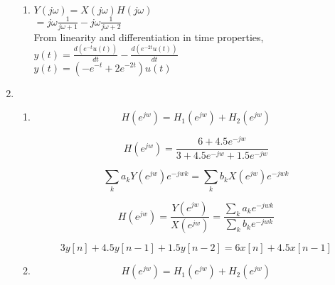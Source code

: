 \documentclass[10pt,a4paper, margin=1in]{article}
\newcommand\ddfrac[2]{\frac{\displaystyle #1}{\displaystyle #2}}
\begin{document}
\begin{enumerate}
\begin{enumerate}
    \item %
    $Y(j\omega) = X(j\omega)H(j\omega)$ \vspace{0.2cm}\\
    \hspace*{1.05cm}$= j\omega\frac{1}{j\omega+1} - j\omega\frac{1}{j\omega+2}$ \vspace{0.2cm}\\
    From linearity and differentiation in time properties, \vspace{0.2cm}\\
    $y(t) = \frac{d(e^{-t}u(t))}{dt} - \frac{d(e^{-2t}u(t))}{dt}$ \vspace{0.2cm}\\
    $y(t) = (-e^{-t}+2e^{-2t})u(t)$ \vspace{0.2cm}\\
    \end{enumerate}

\item %
    \begin{enumerate}   
    \item %
        \begin{equation*}
            H(e^{jw}) = H_1(e^{jw}) + H_2(e^{jw})
        \end{equation*}

        \begin{equation*}
            H(e^{jw}) = \ddfrac{6 + 4.5e^{-jw}}{3+4.5e^{-jw} + 1.5e^{-jw}}
        \end{equation*}

        \begin{equation*}
            \sum_k a_k Y(e^{jw}) e^{-jwk} = \sum_k b_k X(e^{jw})e^{-jwk}
        \end{equation*}

        \begin{equation*}
            H(e^{jw}) = \ddfrac{ Y(e^{jw})}{X(e^{jw})} = \ddfrac{\sum_k a_k e^{-jwk}}{\sum_k b_k e^{-jwk}}
        \end{equation*}

        \begin{equation*}
            3y[n] + 4.5y[n-1]+1.5y[n-2] = 6x[n] + 4.5x[n-1]
        \end{equation*}
    \item %
        \begin{equation*}
            H(e^{jw}) = H_1(e^{jw}) + H_2(e^{jw})
        \end{equation*}


\end{enumerate}
\end{enumerate}
\end{document}
